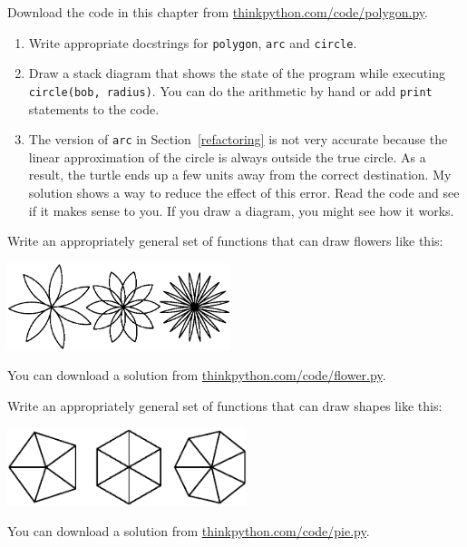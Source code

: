 \documentclass[10pt]{book}
\begin{document}
\begin{ex}

Download the code in this chapter from
\url{thinkpython.com/code/polygon.py}.

\begin{enumerate}

\item Write appropriate docstrings for {\tt polygon}, {\tt arc} and
{\tt circle}.


\item Draw a stack diagram that shows the state of the program
while executing {\tt circle(bob, radius)}.  You can do the
arithmetic by hand or add {\tt print} statements to the code.


\item The version of {\tt arc} in Section~\ref{refactoring} is not
very accurate because the linear approximation of the
circle is always outside the true circle.  As a result,
the turtle ends up a few units away from the correct
destination. My solution shows a way to reduce
the effect of this error.  Read the code and see if it makes
sense to you.  If you draw a diagram, you might see how it works.

\end{enumerate}

\end{ex}


\begin{ex}

Write an appropriately general set of functions that
can draw flowers like this:

\centerline{\includegraphics[height=1in]{figs/flowers.eps}}

You can download a solution from \url{thinkpython.com/code/flower.py}.

\end{ex}


\begin{ex}

Write an appropriately general set of functions that
can draw shapes like this:

\centerline{\includegraphics[height=0.9in]{figs/pies.eps}}

You can download a solution from \url{thinkpython.com/code/pie.py}.

\end{ex}
\end{document}
